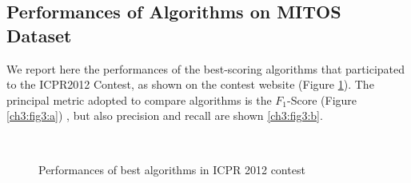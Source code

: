 \subsection{Performances of Algorithms on MITOS Dataset}
\label{ch3:icpr_perf}

We report here the performances of the best-scoring algorithms that participated to the ICPR2012 Contest, as shown on the contest website (Figure \ref{ch3:fig3}).
The principal metric adopted to compare algorithms is the $F_1$-Score (Figure \ref{ch3:fig3:a}) , but also precision and recall are shown \ref{ch3:fig3:b}. 

\begin{figure}[!htb]
  \centering
    \\
    \caption{Performances of best algorithms in ICPR 2012 contest}
    \label{ch3:fig3}
\end{figure}












